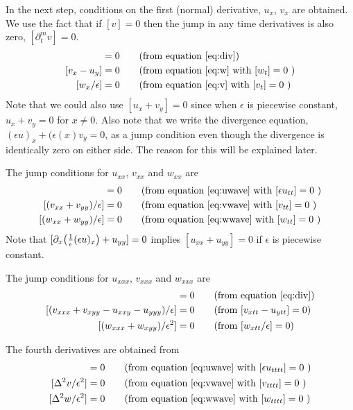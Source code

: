 In the next step, conditions on the first (normal) derivative, $u_x$, $v_x$ are obtained.
We use the fact that if $[v]=0$ then the jump in any time derivatives is also zero, $[\partial_t^m v]=0$.
\begin{align}
     [ (\epsilon u)_x + (\epsilon(x) v_y) ] &=0 \qquad\mbox{(from equation~\eqref{eq:div})}  \\
     [ v_x - u_y ] &= 0  \qquad\mbox{(from equation~\eqref{eq:w} with $[w_t]=0$ )}  \\
     [ w_x/\epsilon ] & = 0 \qquad\mbox{(from equation~\eqref{eq:v} with $[v_t]=0$ )}
\end{align}
Note that we could also use $[ u_x + v_y ]=0$ since when $\epsilon$ is piecewise constant, $u_x+v_y=0$
for $x\ne 0$. Also note that we write the divergence equation, $(\epsilon u)_x + (\epsilon(x) v_y=0$,
as a jump condition even though the divergence is identically zero on either side. The reason for this
will be explained later.


The jump conditions for $u_{xx}$, $v_{xx}$ and $w_{xx}$ are
\begin{align}
     [ u_{xx} + u_{yy} ] &=0 \qquad\mbox{(from equation~\eqref{eq:uwave} with $[\epsilon u_{tt}]=0$ )}    \\
     [ (v_{xx} + v_{yy})/\epsilon ] &= 0  \qquad\mbox{(from equation~\eqref{eq:vwave} with $[v_{tt}]=0$ )}  \\
     [ (w_{xx} + w_{yy})/\epsilon ] &= 0  \qquad\mbox{(from equation~\eqref{eq:wwave} with $[w_{tt}]=0$ )}
\end{align}
Note that $[\partial_x\big( {1\over\epsilon} (\epsilon u)_x\big) + u_{yy}]=0$ implies $[ u_{xx} + u_{yy} ]=0$
if $\epsilon$ is piecewise constant.


The jump conditions for $u_{xxx}$, $v_{xxx}$ and $w_{xxx}$ are
\begin{align}
     [ \Delta u_x + \Delta v_y ] &=0 \qquad\mbox{(from equation~\eqref{eq:div})}  \\
     [ (v_{xxx}+v_{xyy} - u_{xxy} - u_{yyy})/\epsilon ] &= 0  \qquad\mbox{(from $[ v_{xtt} - u_{ytt} ]=0$)} \\
     [ (w_{xxx}+ w_{xyy})/\epsilon^2 ] & = 0 \qquad\mbox{(from $[ w_{xtt}/\epsilon ]=0$)} 
\end{align}

The fourth derivatives are obtained from
\begin{align}
     [ \Delta^2 u /\epsilon ] &=0 \qquad\mbox{(from equation~\eqref{eq:uwave} with $[\epsilon u_{tttt}]=0$ )}    \\
     [ \Delta^2 v/\epsilon^2] &= 0  \qquad\mbox{(from equation~\eqref{eq:vwave} with $[v_{tttt}]=0$ )}  \\
     [ \Delta^2 w/\epsilon^2] &= 0  \qquad\mbox{(from equation~\eqref{eq:wwave} with $[w_{tttt}]=0$ )}
\end{align}


